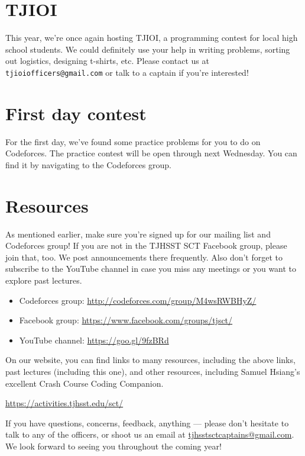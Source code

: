 \documentclass{article}
\begin{document}
\section{TJIOI}

This year, we're once again hosting TJIOI, a programming contest for local high school students. We could definitely use your help in writing problems, sorting out logistics, designing t-shirts, etc. Please contact us at \verb|tjioiofficers@gmail.com| or talk to a captain if you're interested! 


\section{First day contest}

For the first day, we've found some practice problems for you to do on Codeforces. The practice contest will be open through next Wednesday. You can find it by navigating to the Codeforces group.



\section{Resources}

As mentioned earlier, make sure you're signed up for our mailing list and Codeforces group! If you are not in the TJHSST SCT Facebook group, please join that, too. We post announcements there frequently. Also don't forget to subscribe to the YouTube channel in case you miss any meetings or you want to explore past lectures. 


\begin{itemize}
    \item Codeforces group: \url{http://codeforces.com/group/M4wsRWBHyZ/}
    \item Facebook group: \url{https://www.facebook.com/groups/tjsct/}
    \item YouTube channel:
    \url{https://goo.gl/9fzBRd}
\end{itemize}

On our website, you can find links to many resources, including the above links, past lectures (including this one), and other resources, including Samuel Hsiang's excellent Crash Course Coding Companion.

\begin{center}
\Large{\url{https://activities.tjhsst.edu/sct/}}
\end{center}

If you have questions, concerns, feedback, anything — please don't hesitate to talk to any of the officers, or shoot us an email at \url{tjhsstsctcaptains@gmail.com}. We look forward to seeing you throughout the coming year!
\end{document}
